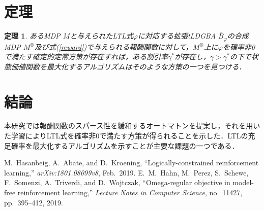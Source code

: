 \documentclass[a4j,9pt,twocolumn]{jsarticle}
\newtheorem{theorem}{定理}
\theoremstyle{definition}
\begin{document}
\section{定理}
\begin{theorem}
  あるMDP $M$と与えられたLTL式$\varphi$に対応する拡張tLDGBA $\bar{B}_{\varphi}$の合成MDP $M^{\otimes}$及び式(\ref{reward})で与えられる報酬関数に対して，$M^{\otimes}$上に$\varphi$を確率非0で満たす確定的定常方策が存在すれば，ある割引率$\gamma^{\ast}$が存在し，$\gamma>\gamma^{\ast}$の下で状態価値関数を最大化するアルゴリズムはそのような方策の一つを見つける．
\end{theorem}

\section{結論}
本研究では報酬関数のスパース性を緩和するオートマトンを提案し，それを用いた学習によりLTL式を確率非0で満たす方策が得られることを示した．LTLの充足確率を最大化するアルゴリズムを示すことが主要な課題の一つである．

\begin{thebibliography}{9}
  M.\ Hasanbeig, A.\ Abate, and D.\ Kroening,
  ``Logically-constrained reinforcement learning,'' \textit{arXiv:1801.08099v8}, Feb.\ 2019.
  E.\ M.\ Hahn, M.\ Perez, S.\ Schewe, F.\ Somenzi, A.\ Triverdi, and D.\ Wojtczak,
  ``Omega-regular objective in model-free reinforcement learning,''
  \textit{Lecture Notes in Computer Science}, no.\ 11427, pp.\ 395--412, 2019.
\end{thebibliography}
\newpage
\pagebreak
\end{document}

